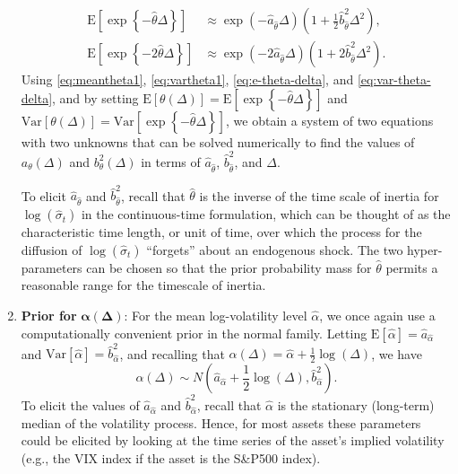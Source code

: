 \documentclass[10pt]{article}
\newcommand{\hb}{\hat{b}}
\newcommand{\ha}{\hat{a}}
\newcommand{\htheta}{\hat{\theta}}
\newcommand{\halpha}{\hat{\alpha}}
\newcommand{\hsigma}{\hat{\sigma}}
\newcommand{\E}[1]{\mbox{E}\left[#1\right]}
\newcommand{\Var}[1]{\mbox{Var}\left[#1\right]}
\newcommand{\expo}[1]{ \exp\left\{ #1 \right\}}
\begin{document}
\begin{enumerate}[]
\begin{align}
\E{\expo{-\htheta \Delta}} &\approx \exp \left(-\ha_{\htheta} \Delta \right) \left( 1 + \frac{1}{2} \hb_{\htheta}^2 \Delta^2 \right) \label{eq:e-theta-delta}, \\
%
\E{\expo{-2\htheta \Delta}} &\approx \exp \left(-2\ha_{\htheta} \Delta \right) \left( 1 + 2 \hb_{\htheta}^2 \Delta^2 \right) \label{eq:var-theta-delta}.
\end{align}
Using \eqref{eq:meantheta1}, \eqref{eq:vartheta1}, \eqref{eq:e-theta-delta}, and \eqref{eq:var-theta-delta}, and by setting $\E{\theta(\Delta)}  = \E{\expo{-\htheta \Delta}}$ and $\Var{\theta(\Delta)} = \Var{\expo{-\htheta \Delta}}$, we obtain a system of two equations with two unknowns that can be solved numerically to find the values of $a_\theta(\Delta)$ and $b^2_\theta(\Delta)$ in terms of $\ha_{\htheta}$, $\hb^2_{\htheta}$, and $\Delta$.

To elicit $\ha_{\htheta}$ and $\hb^2_{\htheta}$, recall that $\hat{\theta}$ is the inverse of the time scale of inertia for $\log(\hsigma_t)$ in the continuous-time formulation, which can be thought of as the characteristic time length, or unit of time, over which the process for the diffusion of $\log(\hsigma_t)$ ``forgets'' about an endogenous shock. The two hyper-parameters can be chosen so that the prior probability mass for $\htheta$ permits a reasonable range for the timescale of inertia.


\item{\textbf{Prior for } $\boldsymbol{\alpha}(\boldsymbol{\Delta})$:} For the mean log-volatility level $\halpha$, we once again use a computationally convenient prior in the normal family.  Letting $\E{\halpha} = \hat{a}_{\halpha}$ and $\Var{\halpha} = \hat{b}^2_{\halpha}$, and recalling that $\alpha(\Delta) = \hat{\alpha} + \frac{1}{2}\log(\Delta)$, we have
$$
\alpha(\Delta) \sim N\left(\hat{a}_{\halpha} + \frac{1}{2} \log(\Delta), \hat{b}^2_{\halpha}\right).
$$
To elicit the values of $\hat{a}_{\halpha}$ and $\hat{b}^2_{\halpha}$, recall that $\hat{\alpha}$ is the stationary (long-term) median of the volatility process.  Hence, for most assets these parameters could be elicited by looking at the time series of the asset's implied volatility (e.g., the VIX index if the asset is the S\&P500 index).



\end{enumerate}
\end{document}
